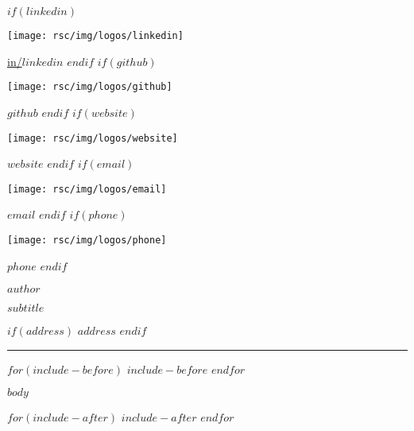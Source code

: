 \documentclass[
$if(fontsize)$
    $fontsize$,
$endif$
$if(lang)$
    $babel-lang$,
$endif$
$if(papersize)$
    $papersize$paper,
$endif$
$for(classoption)$
    $classoption$$sep$,
$endfor$
]{$documentclass$}
\newcommand{\HRule}{\noindent\rule{\linewidth}{0.1mm}}
\begin{document}
\vspace*{-2cm}
\begin{multicols}{3}
\begin{flushleft}
    \scriptsize
    \vspace*{\fill}
    $if(linkedin)$
        \begin{minipage}{0.8\baselineskip}
            \texttt{[image: rsc/img/logos/linkedin]}
        \end{minipage}
        \href{https://www.linkedin.com/in/$linkedin$}{in/$linkedin$}
        \linebreak
    $endif$
    $if(github)$
        \begin{minipage}{0.8\baselineskip}
            \texttt{[image: rsc/img/logos/github]}
        \end{minipage}
        \href{https://github.com/$github$}{$github$}
        \linebreak
    $endif$
    $if(website)$
        \begin{minipage}{0.8\baselineskip}
            \texttt{[image: rsc/img/logos/website]}
        \end{minipage}
        \href{https://$website$}{$website$}
        \linebreak
    $endif$
    $if(email)$
        \begin{minipage}{0.8\baselineskip}
            \texttt{[image: rsc/img/logos/email]}
        \end{minipage}
        \href{mailto:$email$?subject=Heyy!&body=What can I do for you? :)}{$email$}
        \linebreak
    $endif$
    $if(phone)$
        \begin{minipage}{0.8\baselineskip}
            \texttt{[image: rsc/img/logos/phone]}
        \end{minipage}
        $phone$
    $endif$
\end{flushleft}
\columnbreak

\begin{center}
    \huge
    \vspace*{\fill}
    \textbf{$author$}
    \vspace{0.1cm}

    \scriptsize
    $subtitle$
\end{center}
\columnbreak

\begin{flushright}
    \scriptsize
    \vspace*{\fill}
    $if(address)$
        $address$
    $endif$
\end{flushright}
\end{multicols}
\vspace{-0.3cm}
\HRule
\thispagestyle{fancy}

$for(include-before)$
    $include-before$
$endfor$

$body$

$for(include-after)$
    $include-after$
$endfor$

\end{document}
